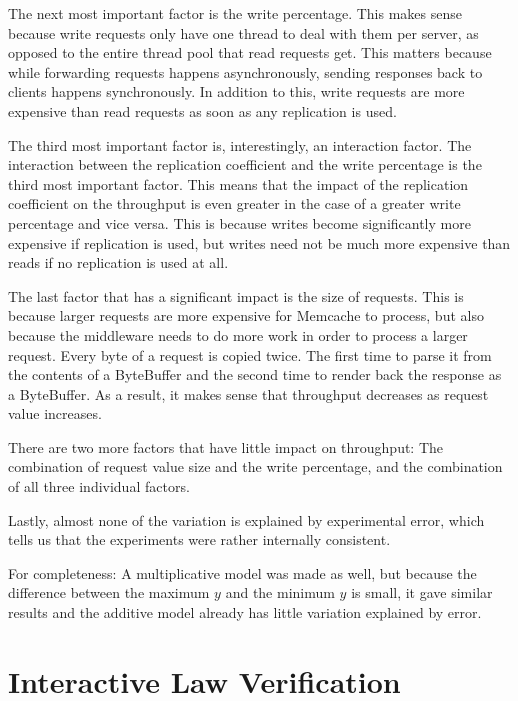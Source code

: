 \documentclass[11pt]{article}
\begin{document}
The next most important factor is the write percentage.
This makes sense because write requests only have one thread to deal with them per server, as opposed to the entire thread pool that read requests get.
This matters because while forwarding requests happens asynchronously, sending responses back to clients happens synchronously.
In addition to this, write requests are more expensive than read requests as soon as any replication is used.

The third most important factor is, interestingly, an interaction factor.
The interaction between the replication coefficient and the write percentage is the third most important factor.
This means that the impact of the replication coefficient on the throughput is even greater in the case of a greater write percentage and vice versa.
This is because writes become significantly more expensive if replication is used, but writes need not be much more expensive than reads if no replication is used at all.

The last factor that has a significant impact is the size of requests.
This is because larger requests are more expensive for Memcache to process, but also because the middleware needs to do more work in order to process a larger request.
Every byte of a request is copied twice.
The first time to parse it from the contents of a ByteBuffer and the second time to render back the response as a ByteBuffer.
As a result, it makes sense that throughput decreases as request value increases.

There are two more factors that have little impact on throughput: The combination of request value size and the write percentage, and the combination of all three individual factors.

Lastly, almost none of the variation is explained by experimental error, which tells us that the experiments were rather internally consistent.

For completeness: A multiplicative model was made as well, but because the difference between the maximum $y$ and the minimum $y$ is small, it gave similar results and the additive model already has little variation explained by error.

\section{Interactive Law Verification}\label{sec:interactive-law}


\end{document}
